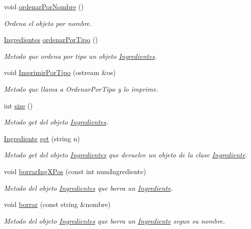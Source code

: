 \begin{DoxyCompactItemize}
void \hyperlink{classIngredientes_a6cd27f6353a430fae6db51695dac95b5}{ordenar\+Por\+Nombre} ()
\begin{DoxyCompactList}\small\item\em Ordena el objeto por nombre. \end{DoxyCompactList}\item 
\hyperlink{classIngredientes}{Ingredientes} \hyperlink{classIngredientes_a0ed6997b0c31498c42562d91a6df955d}{ordenar\+Por\+Tipo} ()
\begin{DoxyCompactList}\small\item\em Metodo que ordena por tipo un objeto \hyperlink{classIngredientes}{Ingredientes}. \end{DoxyCompactList}\item 
void \hyperlink{classIngredientes_a9a3accd03d7af199cd1ee99350ab5626}{Imprimir\+Por\+Tipo} (ostream \&os)
\begin{DoxyCompactList}\small\item\em Metodo que llama a Ordenar\+Por\+Tipo y lo imprime. \end{DoxyCompactList}\item 
int \hyperlink{classIngredientes_aca2d4295b616fd0efeafce91009e0dda}{size} ()
\begin{DoxyCompactList}\small\item\em Metodo get del objeto \hyperlink{classIngredientes}{Ingredientes}. \end{DoxyCompactList}\item 
\hyperlink{classIngrediente}{Ingrediente} \hyperlink{classIngredientes_a1eddfac49913e486490721f6c114bf30}{get} (string n)
\begin{DoxyCompactList}\small\item\em Metodo get del objeto \hyperlink{classIngredientes}{Ingredientes} que devuelve un objeto de la clase \hyperlink{classIngrediente}{Ingrediente}. \end{DoxyCompactList}\item 
void \hyperlink{classIngredientes_a8d2f13225611193fe2a03b5a8d74cab7}{borrar\+Ing\+X\+Pos} (const int num\+Ingrediente)
\begin{DoxyCompactList}\small\item\em Metodo del objeto \hyperlink{classIngredientes}{Ingredientes} que borra un \hyperlink{classIngrediente}{Ingrediente}. \end{DoxyCompactList}\item 
void \hyperlink{classIngredientes_af3fa6c08d9fea867c2f4dd3efad4223c}{borrar} (const string \&nombre)
\begin{DoxyCompactList}\small\item\em Metodo del objeto \hyperlink{classIngredientes}{Ingredientes} que borra un \hyperlink{classIngrediente}{Ingrediente} segun su nombre. \end{DoxyCompactList}\item 

\end{DoxyCompactItemize}
